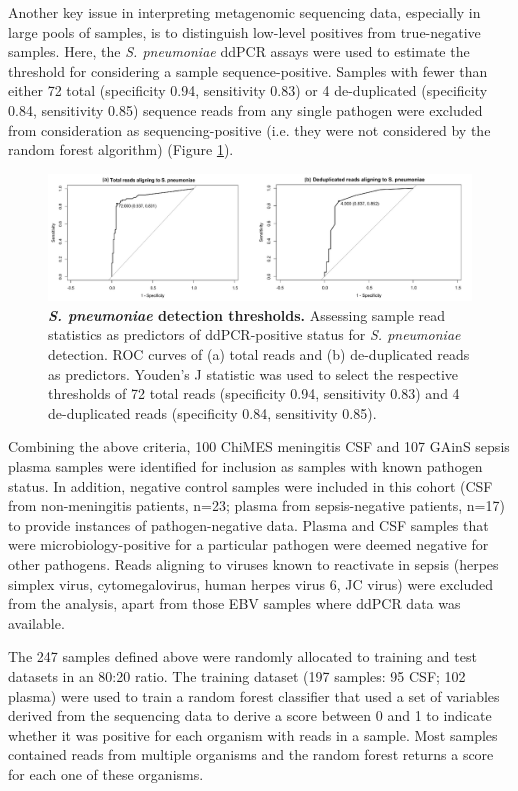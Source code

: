 Another key issue in interpreting metagenomic sequencing data, especially in large pools of samples, is to distinguish low-level positives from true-negative samples. Here, the \textit{S. pneumoniae} ddPCR assays were used to estimate the threshold for considering a sample sequence-positive. Samples with fewer than either 72 total (specificity 0.94, sensitivity 0.83) or 4 de-duplicated (specificity 0.84, sensitivity 0.85) sequence reads from any single pathogen were excluded from consideration as sequencing-positive (i.e. they were not considered by the random forest algorithm) (Figure \ref{fig:strep-threshold}).

\FloatBarrier
\begin{figure}[htbp]
\centering
\includegraphics[scale=0.8]{./Results2/Images/strep-threshold.png}
\caption[\textit{S. pneumoniae} detection thresholds]{\textbf{\textit{S. pneumoniae} detection thresholds.} Assessing sample read statistics as predictors of ddPCR-positive status for \textit{S. pneumoniae} detection. ROC curves of (a) total reads and (b) de-duplicated reads as predictors. Youden's J statistic was used to select the respective thresholds of 72 total reads (specificity 0.94, sensitivity 0.83) and 4 de-duplicated reads (specificity 0.84, sensitivity 0.85).}
\label{fig:strep-threshold}
\end{figure}

Combining the above criteria, 100 ChiMES meningitis CSF and 107 GAinS sepsis plasma samples were identified for inclusion as samples with known pathogen status. In addition, negative control samples were included in this cohort (CSF from non-meningitis patients, n=23; plasma from sepsis-negative patients, n=17) to provide instances of pathogen-negative data. Plasma and CSF samples that were microbiology-positive for a particular pathogen were deemed negative for other pathogens. Reads aligning to viruses known to reactivate in sepsis (herpes simplex virus, cytomegalovirus, human herpes virus 6, JC virus) were excluded from the analysis, apart from those EBV samples where ddPCR data was available.

The 247 samples defined above were randomly allocated to training and test datasets in an 80:20 ratio. The training dataset (197 samples: 95 CSF; 102 plasma) were used to train a random forest classifier that used a set of variables derived from the sequencing data to derive a score between 0 and 1 to indicate whether it was positive for each organism with reads in a sample. Most samples contained reads from multiple organisms and the random forest returns a score for each one of these organisms.

